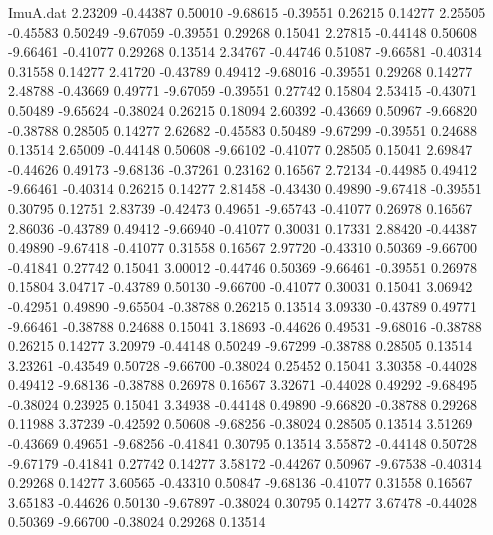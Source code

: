 \begin{filecontents}{ImuA.dat}
   2.23209   -0.44387    0.50010   -9.68615   -0.39551    0.26215    0.14277
   2.25505   -0.45583    0.50249   -9.67059   -0.39551    0.29268    0.15041
   2.27815   -0.44148    0.50608   -9.66461   -0.41077    0.29268    0.13514
   2.34767   -0.44746    0.51087   -9.66581   -0.40314    0.31558    0.14277
   2.41720   -0.43789    0.49412   -9.68016   -0.39551    0.29268    0.14277
   2.48788   -0.43669    0.49771   -9.67059   -0.39551    0.27742    0.15804
   2.53415   -0.43071    0.50489   -9.65624   -0.38024    0.26215    0.18094
   2.60392   -0.43669    0.50967   -9.66820   -0.38788    0.28505    0.14277
   2.62682   -0.45583    0.50489   -9.67299   -0.39551    0.24688    0.13514
   2.65009   -0.44148    0.50608   -9.66102   -0.41077    0.28505    0.15041
   2.69847   -0.44626    0.49173   -9.68136   -0.37261    0.23162    0.16567
   2.72134   -0.44985    0.49412   -9.66461   -0.40314    0.26215    0.14277
   2.81458   -0.43430    0.49890   -9.67418   -0.39551    0.30795    0.12751
   2.83739   -0.42473    0.49651   -9.65743   -0.41077    0.26978    0.16567
   2.86036   -0.43789    0.49412   -9.66940   -0.41077    0.30031    0.17331
   2.88420   -0.44387    0.49890   -9.67418   -0.41077    0.31558    0.16567
   2.97720   -0.43310    0.50369   -9.66700   -0.41841    0.27742    0.15041
   3.00012   -0.44746    0.50369   -9.66461   -0.39551    0.26978    0.15804
   3.04717   -0.43789    0.50130   -9.66700   -0.41077    0.30031    0.15041
   3.06942   -0.42951    0.49890   -9.65504   -0.38788    0.26215    0.13514
   3.09330   -0.43789    0.49771   -9.66461   -0.38788    0.24688    0.15041
   3.18693   -0.44626    0.49531   -9.68016   -0.38788    0.26215    0.14277
   3.20979   -0.44148    0.50249   -9.67299   -0.38788    0.28505    0.13514
   3.23261   -0.43549    0.50728   -9.66700   -0.38024    0.25452    0.15041
   3.30358   -0.44028    0.49412   -9.68136   -0.38788    0.26978    0.16567
   3.32671   -0.44028    0.49292   -9.68495   -0.38024    0.23925    0.15041
   3.34938   -0.44148    0.49890   -9.66820   -0.38788    0.29268    0.11988
   3.37239   -0.42592    0.50608   -9.68256   -0.38024    0.28505    0.13514
   3.51269   -0.43669    0.49651   -9.68256   -0.41841    0.30795    0.13514
   3.55872   -0.44148    0.50728   -9.67179   -0.41841    0.27742    0.14277
   3.58172   -0.44267    0.50967   -9.67538   -0.40314    0.29268    0.14277
   3.60565   -0.43310    0.50847   -9.68136   -0.41077    0.31558    0.16567
   3.65183   -0.44626    0.50130   -9.67897   -0.38024    0.30795    0.14277
   3.67478   -0.44028    0.50369   -9.66700   -0.38024    0.29268    0.13514

\end{filecontents}
